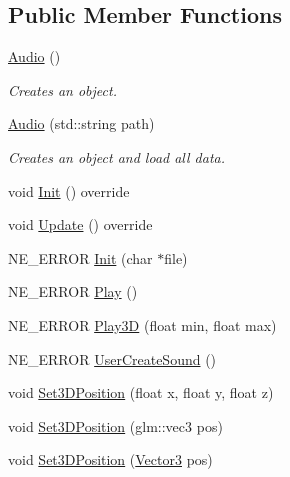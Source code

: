 \subsection*{Public Member Functions}
\begin{DoxyCompactItemize}
\item 
\mbox{\label{class_audio_aa9d3935a2b91ab4b825bc0cb05f245ea}} 
\mbox{\hyperlink{class_audio_aa9d3935a2b91ab4b825bc0cb05f245ea}{Audio}} ()
\begin{DoxyCompactList}\small\item\em Creates an object. \end{DoxyCompactList}\item 
\mbox{\label{class_audio_adf18a452ba3e8d8d11b5cbbaaf5d3b9a}} 
\mbox{\hyperlink{class_audio_adf18a452ba3e8d8d11b5cbbaaf5d3b9a}{Audio}} (std\+::string path)
\begin{DoxyCompactList}\small\item\em Creates an object and load all data. \end{DoxyCompactList}\item 
void \mbox{\hyperlink{class_audio_aec12bdecd60ff3fdeebebfb823902ff9}{Init}} () override
\item 
void \mbox{\hyperlink{class_audio_a2bf85fb3962720a9dce2bdfa988b0f11}{Update}} () override
\item 
N\+E\+\_\+\+E\+R\+R\+OR \mbox{\hyperlink{class_audio_a8d7e94a82e16646a1b74535834d751b9}{Init}} (char $\ast$file)
\item 
N\+E\+\_\+\+E\+R\+R\+OR \mbox{\hyperlink{class_audio_a2528c364d97e19cd005b0461ec8cbfb1}{Play}} ()
\item 
N\+E\+\_\+\+E\+R\+R\+OR \mbox{\hyperlink{class_audio_a8ce5260db0daaef85f4509fdad58cbab}{Play3D}} (float min, float max)
\item 
N\+E\+\_\+\+E\+R\+R\+OR \mbox{\hyperlink{class_audio_a74ba8f7352c4d8c3a248d9eda9ff03bd}{User\+Create\+Sound}} ()
\item 
void \mbox{\hyperlink{class_audio_a141af36f2bb5f0d6e655efc81bf3d365}{Set3\+D\+Position}} (float x, float y, float z)
\item 
void \mbox{\hyperlink{class_audio_a49f139c550d5b317d9aa8f9b0342ac0d}{Set3\+D\+Position}} (glm\+::vec3 pos)
\item 
void \mbox{\hyperlink{class_audio_ae7d4d77c6f481e4d4a261d89bf24809a}{Set3\+D\+Position}} (\mbox{\hyperlink{struct_vector3}{Vector3}} pos)
\item 

\end{DoxyCompactItemize}
